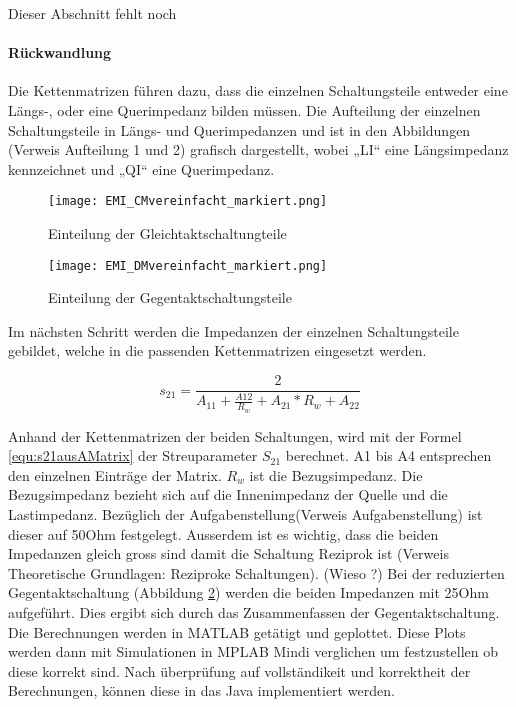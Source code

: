 
Dieser Abschnitt fehlt noch


\paragraph{Rückwandlung} \label{par:ruckwandlung}

Die Kettenmatrizen führen dazu, dass die einzelnen Schaltungsteile entweder eine Längs-, oder eine Querimpedanz bilden müssen. Die Aufteilung der einzelnen Schaltungsteile in Längs- und  Querimpedanzen und ist in den Abbildungen (Verweis Aufteilung 1 und 2) grafisch dargestellt, wobei „LI“ eine Längsimpedanz kennzeichnet und „QI“ eine Querimpedanz.
\begin{figure}[H]
		\centering
		\texttt{[image: EMI\_CMvereinfacht\_markiert.png]}
		\label{fig:cmschaltung}
		\caption{Einteilung der Gleichtaktschaltungteile}
\end{figure}

\begin{figure}[H]
		\centering
		\texttt{[image: EMI\_DMvereinfacht\_markiert.png]}
		\label{fig:dmschaltung}
		\caption{Einteilung der Gegentaktschaltungsteile}
\end{figure}

Im nächsten Schritt werden die Impedanzen der einzelnen Schaltungsteile gebildet, welche in die passenden Kettenmatrizen eingesetzt werden.

\begin{equation}\label{equ:s21ausAMatrix}
s_{21} = \frac{2}{A_{11}+\frac{A{12}}{R_w}+A_{21}*R_w+A_{22}}
\end{equation}



Anhand der Kettenmatrizen der beiden Schaltungen, wird mit der Formel \ref{equ:s21ausAMatrix} der Streuparameter $S_{21}$ berechnet. A1 bis A4 entsprechen den einzelnen Einträge der Matrix. $R_w$ ist die Bezugsimpedanz. Die Bezugsimpedanz bezieht sich auf die Innenimpedanz der Quelle und die Lastimpedanz. Bezüglich der Aufgabenstellung(Verweis Aufgabenstellung) ist dieser auf 50Ohm festgelegt. Ausserdem ist es wichtig, dass die beiden Impedanzen gleich gross sind damit die Schaltung Reziprok ist (Verweis Theoretische Grundlagen: Reziproke Schaltungen). (Wieso ?) 
Bei der reduzierten Gegentaktschaltung (Abbildung \ref{fig:dmschaltung}) werden die beiden Impedanzen mit 25Ohm aufgeführt. Dies ergibt sich durch das Zusammenfassen der Gegentaktschaltung.\\


Die Berechnungen werden in MATLAB getätigt und geplottet. Diese Plots werden dann mit Simulationen in MPLAB Mindi verglichen um festzustellen ob diese korrekt sind. Nach überprüfung auf vollständikeit und korrektheit der Berechnungen, können diese in das Java implementiert werden. 